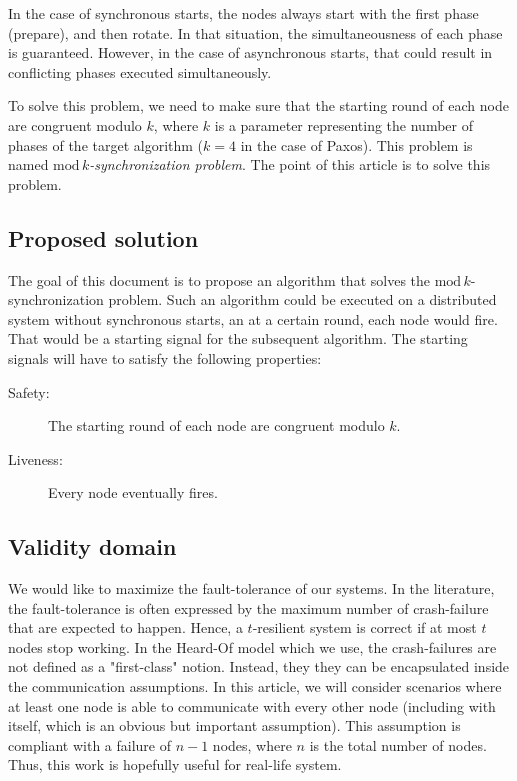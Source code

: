 \documentclass{article}
\begin{document}
In the case of synchronous starts, the nodes always start with the first phase (prepare), and then rotate.
In that situation, the simultaneousness of each phase is guaranteed.
However, in the case of asynchronous starts, that could result in conflicting phases executed simultaneously.

To solve this problem, we need to make sure that the starting round of each node are congruent modulo $k$,
where $k$ is a parameter representing the number of phases of the target algorithm ($k=4$ in the case of Paxos).
This problem is named \emph{$\mathrm{mod}\,k$-synchronization problem}.
The point of this article is to solve this problem.

\subsection{Proposed solution}

The goal of this document is to propose an algorithm that solves the $\mathrm{mod}\,k$-synchronization problem.
Such an algorithm could be executed on a distributed system without synchronous starts,
an at a certain round, each node would fire.
That would be a starting signal for the subsequent algorithm.
The starting signals will have to satisfy the following properties:
\begin{description}
	\item[Safety:] The starting round of each node are congruent modulo $k$.
	\item[Liveness:] Every node eventually fires.
\end{description}

\subsection{Validity domain}

We would like to maximize the fault-tolerance of our systems.
In the literature, the fault-tolerance is often expressed by the maximum number of crash-failure that are expected to happen.
Hence, a $t$-resilient system is correct if at most $t$ nodes stop working.
In the Heard-Of model \cite{model_ho} which we use, the crash-failures are not defined as a "first-class" notion.
Instead, they they can be encapsulated inside the communication assumptions.
In this article, we will consider scenarios where at least one node is able to communicate with every other node (including with itself, which is an obvious but important assumption).
This assumption is compliant with a failure of $n-1$ nodes, where $n$ is the total number of nodes.
Thus, this work is hopefully useful for real-life system.
\end{document}
